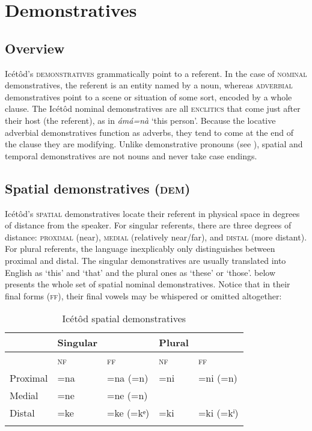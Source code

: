 \section{Demonstratives}\label{sec:6}



\subsection{Overview}\label{sec:6.1}


Icétôd’s \textsc{demonstratives} grammatically point to a referent. In the case of \textsc{nominal} demonstratives, the referent is an entity named by a noun, whereas \textsc{adverbial} demonstratives point to a scene or situation of some sort, encoded by a whole clause. The Icétôd nominal demonstratives are all \textsc{enclitics} that come just after their host (the referent), as in \textit{ámá=nà} ‘this person’. Because the locative adverbial demonstratives function as adverbs, they tend to come at the end of the clause they are modifying. Unlike demonstrative pronouns (see ), spatial and temporal demonstratives are not nouns and never take case endings.




\subsection{Spatial demonstratives (\textsc{dem})}\label{sec:6.2}


Icétôd’s \textsc{spatial} demonstratives locate their referent in physical space in degrees of distance from the speaker. For singular referents, there are three degrees of distance: \textsc{proximal} (near), \textsc{medial} (relatively near/far), and \textsc{distal} (more distant). For plural referents, the language inexplicably only distinguishes between proximal and distal. The singular demonstratives are usually translated into English as ‘this’ and ‘that’ and the plural ones as ‘these’ or ‘those’.  below presents the whole set of spatial nominal demonstratives. Notice that in their final forms (\textsc{ff}), their final vowels may be whispered or omitted altogether:


\begin{table}
\caption{Icétôd spatial demonstratives}
\label{tab:dem:spat}
\begin{tabularx}{\textwidth}{XXXXX}
\lsptoprule
& Singular &  & Plural & \\
\midrule
& \textsc{nf} & \textsc{ff} & \textsc{nf} & \textsc{ff}\\
Proximal & =na & =na (=n) & =ni & =ni (=n)\\
Medial & =ne & =ne (=n) &  & \\
Distal & =ke & =ke (=kᵉ) & =ki & =ki (=kⁱ)\\
\lspbottomrule
\end{tabularx}
\end{table}

